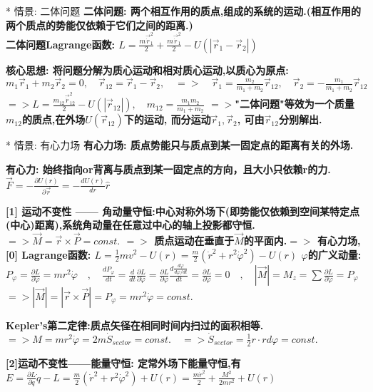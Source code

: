     * 情景: 二体问题
        \bf{二体问题}: 两个相互作用的质点,组成的系统的运动.(相互作用的两个质点的势能仅依赖于它们之间的距离.)\\
        二体问题Lagrange函数:
            $L = \frac{m \vec \dot r_1^2}{2} + \frac{m \vec \dot r_1^2}{2} - U(|\vec r_1 - \vec r_2|)$
        
        \bf{核心思想}: 将问题分解为\bf{质心运动}和\bf{相对质心运动},以质心为原点:
            $m_1\vec r_1 + m_2 \vec r_2 =0,\quad \vec r_{12} = \vec r_1 - \vec r_2, \quad => \quad \vec r_1 = \frac{m_2}{m_1 + m_2}\vec r_{12}, \quad \vec r_2 = - \frac{m_1}{m_1 + m_2}\vec r_{12} $
            $ => L = \frac{m_{12} \vec \dot r_{12}^2}{2} - U(|\vec r_{12}|), \quad m_{12} = \frac{m_1 m_2}{m_1 + m_2}$
            $ =>$"二体问题"等效为一个质量$m_{12}$的质点,在外场$U(\vec r_{12})$下的运动, 而分运动$\vec r_1, \vec r_2$, 可由$\vec r_{12}$分别解出.
        
        
    * 情景: 有心力场
        \bf{有心力场}: 质点势能只与质点到某一固定点的距离有关的外场.
        
        \bf{有心力}: 始终指向or背离与质点到某一固定点的方向，且大小只依赖r的力.
            $\vec F = -\frac{∂ U(r)}{∂ \vec r} = -\frac{d U(r)}{d r} \hat r$
    
        \bf{[1] 运动不变性 —— 角动量守恒}:中心对称外场下(即势能仅依赖到空间某特定点(中心)距离),系统角动量在任意过中心的轴上投影都守恒.
            $ => \vec M = \vec r \times \vec P = const.$
            $ =>$ 质点运动在垂直于$\vec M$的平面内.\quad $ =>$ 有心力场,\bf{[0] Lagrange函数}:
            $L = \frac{1}{2}m v^2 - U(r) = \frac{m}{2} (\dot r^2 + r^2 \dot \varphi ^2) - U(r)$
            $\varphi$的广义动量:
            $P_\varphi = \frac{∂ L}{∂ \dot \varphi} = m r^2 \dot \varphi \quad , \quad \frac{d P_\varphi}{d t} = \frac{d}{d t}\frac{∂ L}{∂ \dot \varphi} = \frac{∂ L}{∂ \varphi} \frac{d \frac{d \varphi}{d \varphi / d t}}{d t} = \frac{∂ L}{∂ \varphi} = 0 \quad , \quad |\vec M| = M_z = \sum \frac{∂ L}{∂  \dot \varphi} = P_\varphi$
            $ => |\vec M| =| \vec r \times \vec P |= P_\varphi = m r^2 \dot \varphi = const.$
    
        \bf{Kepler's第二定律}:质点矢径在相同时间内扫过的面积相等.
            $ => M = m r^2 \dot \varphi = 2 m \dot S_{sector} = const.\quad => \dot S_{sector} = \frac{1}{2} r \cdot r d\varphi = const.$
    
        \bf{[2]运动不变性——能量守恒}: 定常外场下能量守恒,有
            $E = \frac{∂ L}{∂ \dot q}\dot q - L = \frac{m}{2} (\dot r^2 + r^2 \dot \varphi ^2) + U(r) = \frac{m \dot r^2}{2} + \frac{M^2}{2mr^2} + U(r)$
    
